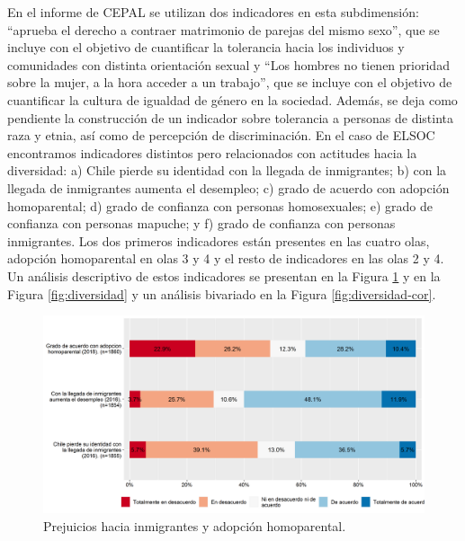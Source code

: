 \documentclass[
  12pt,
]{book}
\begin{document}
En el informe de CEPAL se utilizan dos indicadores en esta subdimensión: ``aprueba el derecho a contraer matrimonio de parejas del mismo sexo'', que se incluye con el objetivo de cuantificar la tolerancia hacia los individuos y comunidades con distinta orientación sexual y ``Los hombres no tienen prioridad sobre la mujer, a la hora acceder a un trabajo'', que se incluye con el objetivo de cuantificar la cultura de igualdad de género en la sociedad. Además, se deja como pendiente la construcción de un indicador sobre tolerancia a personas de distinta raza y etnia, así como de percepción de discriminación. En el caso de ELSOC encontramos indicadores distintos pero relacionados con actitudes hacia la diversidad: a) Chile pierde su identidad con la llegada de inmigrantes; b) con la llegada de inmigrantes aumenta el desempleo; c) grado de acuerdo con adopción homoparental; d) grado de confianza con personas homosexuales; e) grado de confianza con personas mapuche; y f) grado de confianza con personas inmigrantes. Los dos primeros indicadores están presentes en las cuatro olas, adopción homoparental en olas 3 y 4 y el resto de indicadores en las olas 2 y 4. Un análisis descriptivo de estos indicadores se presentan en la Figura \ref{fig:prejuicios} y en la Figura \ref{fig:diversidad} y un análisis bivariado en la Figura \ref{fig:diversidad-cor}.

\begin{figure}[H]

{\centering \includegraphics[width=1\linewidth,height=1\textheight]{output/graphs/prejuicios} 

}

\caption{Prejuicios hacia inmigrantes y adopción homoparental.}\label{fig:prejuicios}
\end{figure}
\end{document}

